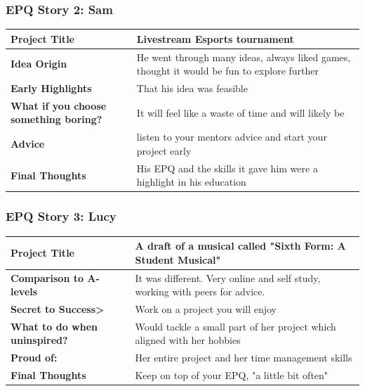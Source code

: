 \subsubsection*{EPQ Story 2: Sam}
\begin{tabularx}{\textwidth}{@{}lX@{}}
    \toprule
    \textbf{Project Title}                        & Livestream Esports tournament                                                              \\
    \midrule
    \textbf{Idea Origin}                          & He went through many ideas, always liked games, thought it would be fun to explore further
    \\
    \textbf{Early Highlights}                     & That his idea was feasible
    \\
    \textbf{What if you choose something boring?} &
    It will feel like a waste of time and will likely be
    \\
    \textbf{Advice}                               &
    listen to your mentors advice and start your project early
    \\

    \textbf{Final Thoughts}                       & His EPQ and the skills it gave him were a highlight in his education                       \\
    \bottomrule
\end{tabularx}

\subsubsection*{EPQ Story 3: Lucy}
\begin{tabularx}{\textwidth}{@{}lX@{}}
    \toprule
    \textbf{Project Title}               & A draft of a musical called "Sixth Form: A Student Musical"                   \\
    \midrule
    \textbf{Comparison to A-levels}      & It was different. Very online and self study, working with peers for advice. \\
    \textbf{Secret to Success>}          & Work on a project you will enjoy                                             \\
    \textbf{What to do when uninspired?} &
    Would tackle a small part of her project which aligned with her hobbies                                             \\
    \textbf{Proud of:}                   &
    Her entire project and her time management skills
    \\

    \textbf{Final Thoughts}              & Keep on top of your EPQ, "a little bit often"
    \\
    \bottomrule
\end{tabularx}


